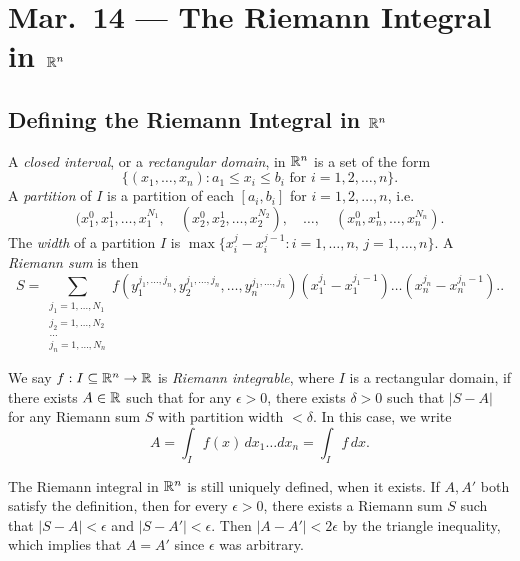 \chapter{Mar.~14 --- The Riemann Integral in \texorpdfstring{$\mathbb{R}^n$}{Rn}}

\section{Defining the Riemann Integral in \texorpdfstring{$\mathbb{R}^n$}{Rn}}

\begin{definition}
  A \emph{closed interval}, or a \emph{rectangular domain},
  in $\mathbb{R}^n$ is a set of the form
  \[
    \{
      (x_1, \dots, x_n) : a_1 \le x_i \le b_i \text{ for } i = 1, 2, \dots, n
    \}.
  \]
  A \emph{partition} of $I$ is a partition of each
  $[a_i, b_i]$ for $i = 1, 2, \dots, n$, i.e.
  \[
    (x_1^0, x_1^1, \dots, x_1^{N_1}, \quad (x_2^0, x_2^1, \dots, x_2^{N_2}), \quad \dots, \quad (x_n^0, x_n^1, \dots, x_n^{N_n}).
  \]
  The \emph{width} of a partition $I$ is
  $\max\{x_i^{j} - x_{i}^{j - 1} : i = 1, \dots, n,\, j = 1, \dots, n\}$. A \emph{Riemann sum} is then
  \[
    S = \sum_{\substack{j_1 = 1, \dots, N_1 \\ j_2 = 1, \dots, N_2 \\ \dots \\ j_n = 1, \dots , N_n}} f(y_1^{j_1, \dots, j_n}, y_2^{j_1, \dots, j_n}, \dots, y_n^{j_1, \dots, j_n}) (x_1^{j_1} - x_1^{j_1 - 1}) \dots (x_n^{j_n} - x_n^{j_n - 1}).
  .\]
\end{definition}

\begin{definition}
  We say $f : I \subseteq \mathbb{R}^n \to \mathbb{R}$ is \emph{Riemann integrable}, where $I$ is a rectangular domain,
  if there exists $A \in \mathbb{R}$ such that for any
  $\epsilon > 0$, there exists $\delta > 0$ such that
  $|S - A|$ for any Riemann sum $S$ with partition
  width $< \delta$. In this case, we write
  \[
    A = \int_{I} f(x)\, dx_{1} \dots dx_{n}
    = \int_{I} f\, dx.
  \]
\end{definition}

\begin{remark}
  The Riemann integral in $\mathbb{R}^n$ is still uniquely defined,
  when it exists. If $A, A'$ both satisfy the definition,
  then for every $\epsilon > 0$, there exists a Riemann
  sum $S$ such that $|S - A| < \epsilon$ and $|S - A'| < \epsilon$.
  Then
  $|A - A'| < 2 \epsilon$ by the triangle inequality,
  which implies that
  $A = A'$ since $\epsilon$ was arbitrary.
\end{remark}

